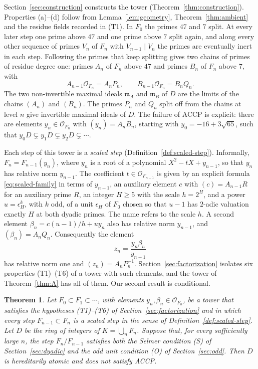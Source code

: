 \documentclass[11pt]{article}
\theoremstyle{plain}
\newtheorem{introtheorem}{Theorem}
\theoremstyle{definition}
\theoremstyle{remark}
\newcommand{\OO}{\mathcal O}
\newcommand{\EA}{\mathfrak m_A}
\newcommand{\EB}{\mathfrak m_B}
\begin{document}
Section~\ref{sec:construction} constructs the tower
(Theorem~\ref{thm:construction}).  Properties (a)--(d) follow from
Lemma~\ref{lem:geometry}, Theorem~\ref{thm:ambient} and the residue fields
recorded in (T1).  In $F_0$ the primes $47$ and $7$ split.  At
every later step one prime above $47$ and one prime above $7$ split again,
and along every other sequence of primes $V_n$ of $F_n$ with
$V_{n+1}\mid V_n$ the primes are eventually inert in each step.  Following the primes that keep splitting gives two chains of
primes of residue degree one: primes $A_n$ of $F_n$ above $47$ and primes
$B_n$ of $F_n$ above $7$, with
\[
 A_{n-1}\OO_{F_n}=A_nP_n,\qquad B_{n-1}\OO_{F_n}=B_nQ_n .
\]
The two non-invertible maximal ideals $\EA$ and $\EB$ of $D$ are the limits
of the chains $(A_n)$ and $(B_n)$.  The primes $P_n$ and $Q_n$ split off
from the chains at level $n$ give invertible maximal ideals of $D$.  The
failure of ACCP is explicit: there are elements $y_n\in\OO_{F_n}$ with
$(y_n)=A_nB_n$, starting with $y_0=-16+3\sqrt{65}$, such that
$y_0D\subsetneq y_1D\subsetneq y_2D\subsetneq\cdots$.

Each step of this tower is a \emph{scaled step}
(Definition~\ref{def:scaled-step}).  Informally, $F_n=F_{n-1}(y_n)$, where
$y_n$ is a root of a polynomial $X^2-tX+y_{n-1}$, so that $y_n$ has
relative norm $y_{n-1}$.  The coefficient $t\in\OO_{F_{n-1}}$ is given by
an explicit formula \eqref{eq:scaled-family} in terms of $y_{n-1}$, an
auxiliary element $c$ with $(c)=A_{n-1}R$ for an auxiliary prime $R$, an
integer $H\ge5$ with the scale $h=2^H$, and a power $u=\epsilon_H^k$, with
$k$ odd, of a unit $\epsilon_H$ of $F_0$ chosen so that $u-1$ has $2$-adic
valuation exactly $H$ at both dyadic primes.  The name refers to the
scale $h$.  A second element $\beta_n=c(u-1)/h+uy_n$ also has relative norm
$y_{n-1}$, and $(\beta_n)=A_nQ_n$.  Consequently the element
\[
 z_n=\frac{y_n\beta_n}{y_{n-1}}
\]
has relative norm one and $(z_n)=A_nP_n^{-1}$.  Section~\ref{sec:factorization}
isolates six properties \textup{(T1)--(T6)} of a tower with such elements,
and the tower of Theorem~\ref{thm:A} has all of them.  Our second result is
conditional.

\begin{introtheorem}\label{thm:B}\label{thm:main}
Let $F_0\subset F_1\subset\cdots$, with elements $y_n,\beta_n\in\OO_{F_n}$,
be a tower that satisfies the hypotheses \textup{(T1)--(T6)} of
Section~\ref{sec:factorization} and in which every step
$F_{n-1}\subset F_n$ is a scaled step in the sense of
Definition~\ref{def:scaled-step}.  Let $D$ be the ring of integers of
$K=\bigcup_nF_n$.  Suppose that, for every sufficiently large $n$, the step
$F_n/F_{n-1}$ satisfies both the Selmer condition \textup{(S)} of
Section~\ref{sec:dyadic} and the odd unit condition \textup{(O)} of
Section~\ref{sec:odd}.  Then $D$ is hereditarily atomic and does not
satisfy ACCP.
\end{introtheorem}
\end{document}
